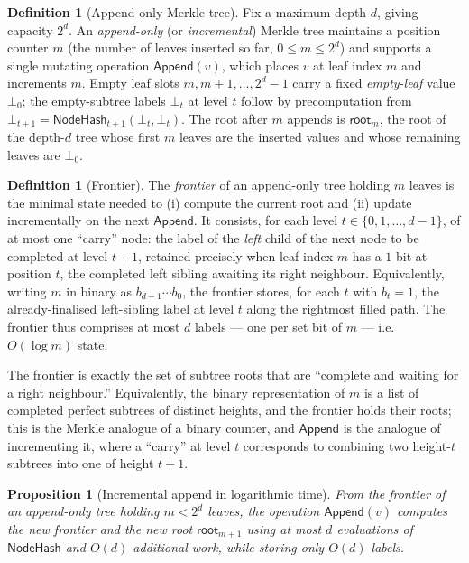 \documentclass[11pt,a4paper]{article}
\newtheorem{proposition}[theorem]{Proposition}
\theoremstyle{definition}
\newtheorem{definition}[theorem]{Definition}
\theoremstyle{remark}
\begin{document}
\begin{definition}[Append-only Merkle tree]\label{merkle:def-append}
Fix a maximum depth \(d\), giving capacity \(2^d\). An \emph{append-only} (or \emph{incremental}) Merkle tree maintains a position counter \(m\) (the number of leaves inserted so far, \(0 \le m \le 2^d\)) and supports a single mutating operation \(\mathsf{Append}(v)\), which places \(v\) at leaf index \(m\) and increments \(m\). Empty leaf slots \(m, m+1, \dots, 2^d - 1\) carry a fixed \emph{empty-leaf} value \(\bot_0\); the empty-subtree labels \(\bot_t\) at level \(t\) follow by precomputation from \(\bot_{t+1} = \mathsf{NodeHash}_{t+1}(\bot_t, \bot_t)\). The root after \(m\) appends is \(\mathsf{root}_m\), the root of the depth-\(d\) tree whose first \(m\) leaves are the inserted values and whose remaining leaves are \(\bot_0\).
\end{definition}

\begin{definition}[Frontier]\label{merkle:def-frontier}
The \emph{frontier} of an append-only tree holding \(m\) leaves is the minimal state needed to (i) compute the current root and (ii) update incrementally on the next \(\mathsf{Append}\). It consists, for each level \(t \in \{0, 1, \dots, d-1\}\), of at most one ``carry'' node: the label of the \emph{left} child of the next node to be completed at level \(t+1\), retained precisely when leaf index \(m\) has a \(1\) bit at position \(t\), the completed left sibling awaiting its right neighbour. Equivalently, writing \(m\) in binary as \(b_{d-1}\cdots b_0\), the frontier stores, for each \(t\) with \(b_t = 1\), the already-finalised left-sibling label at level \(t\) along the rightmost filled path. The frontier thus comprises at most \(d\) labels --- one per set bit of \(m\) --- i.e.\ \(O(\log m)\) state.
\end{definition}

The frontier is exactly the set of subtree roots that are ``complete and waiting for a right neighbour.'' Equivalently, the binary representation of \(m\) is a list of completed perfect subtrees of distinct heights, and the frontier holds their roots; this is the Merkle analogue of a binary counter, and \(\mathsf{Append}\) is the analogue of incrementing it, where a ``carry'' at level \(t\) corresponds to combining two height-\(t\) subtrees into one of height \(t+1\).

\begin{proposition}[Incremental append in logarithmic time]\label{merkle:prop-incremental}
From the frontier of an append-only tree holding \(m < 2^d\) leaves, the operation \(\mathsf{Append}(v)\) computes the new frontier and the new root \(\mathsf{root}_{m+1}\) using at most \(d\) evaluations of \(\mathsf{NodeHash}\) and \(O(d)\) additional work, while storing only \(O(d)\) labels.
\end{proposition}
\end{document}
